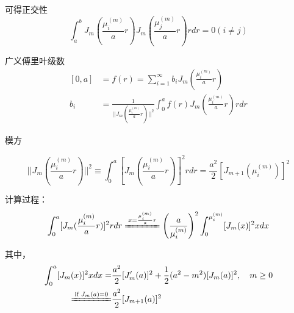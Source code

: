\begin{ex}[扩散问题]
可得正交性
$$\int_{a}^{b}J_{m}\left(\frac{\mu_{i}^{(m)}}{a}r\right)J_{m}\left(\frac{\mu_{j}^{(m)}}{a}r\right)rdr=0(i\neq j)$$

\noindent 广义傅里叶级数
$$\begin{aligned}
    [0,a]&=f(r)=\sum_{i=1}^{\infty}b_{i}J_{m}\left(\frac{\mu_{i}^{(m)}}{a}r\right)\\
    b_{i}&=\frac{1}{||J_{m}(\frac{\mu_{i}^{(m)}}{a}r)||^{2}}\int_{0}^{a}f(r)J_{m}\left(\frac{\mu_{i}^{(m)}}{a}r\right)rdr
\end{aligned}$$

模方

$$\boxed{
   \bigg|\bigg|J_{m}\left(\frac{\mu_{i}^{(m)}}{a}r\right)\bigg|\bigg|^{2}
    \equiv\int_{0}^{a}\left[J_{m}\left(\frac{\mu_{i}^{(m)}}{a}r\right)\right]^{2}rdr
    =\frac{a^{2}}{2}\left[J_{m+1}\left(\mu_{i}^{(m)}\right)\right]^{2}
}$$

计算过程：
$$\int_{0}^{a}[J_{m}(\frac{\mu_{i}^{(m)}}{a}r)]^{2}rdr\xlongequal{x=\frac{\mu_{i}^{(m)}}{a}r}\left(\frac{a}{\mu_{i}^{(m)}}\right)^{2}\int_{0}^{\mu_{i}^{(m)}}[J_{m}(x)]^{2}xdx$$

其中，
$$\begin{aligned}
    \int_{0}^{a}[J_{m}(x)]^{2}xdx
    =&\frac{a^{2}}{2}[J_{m}^{\prime}(a)]^{2}+\frac{1}{2}(a^{2}-m^{2})[J_{m}(a)]^{2},\quad m\geq0\\
    \xlongequal{\text{if\ }J_{m}(a)=0}&\frac{a^{2}}{2}[J_{m+1}(a)]^{2}
\end{aligned}$$
\end{ex}

